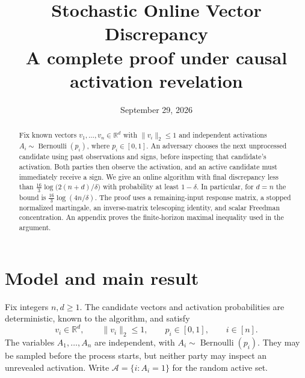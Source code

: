 \documentclass[11pt,a4paper]{article}
\title{\vspace{-1.2em}Stochastic Online Vector Discrepancy\\
  \large A complete proof under causal activation revelation}
\author{}
\date{September 29, 2026}
\numberwithin{equation}{section}
\theoremstyle{remark}
\newcommand{\R}{\mathbb R}
\begin{document}
\maketitle
\vspace{-1.8em}
\begin{abstract}
Fix known vectors $v_1,\ldots,v_n\in\R^d$ with $\|v_i\|_2\le1$ and
independent activations $A_i\sim\operatorname{Bernoulli}(p_i)$, where
$p_i\in[0,1]$. An adversary chooses the next unprocessed candidate using
past observations and signs, before inspecting that candidate's activation.
Both parties then observe the activation, and an active candidate must
immediately receive a sign. We give an online algorithm with final
discrepancy less than
$\frac{16}{3}\log\!\bigl(2(n+d)/\delta\bigr)$ with probability at least
$1-\delta$. In particular, for $d=n$ the bound is
$\frac{16}{3}\log(4n/\delta)$. The proof uses a remaining-input response
matrix, a stopped normalized martingale, an inverse-matrix telescoping
identity, and scalar Freedman concentration. An appendix proves the
finite-horizon maximal inequality used in the argument.
\end{abstract}

\section{Model and main result}
\label{sec:model}

Fix integers $n,d\ge1$. The candidate vectors and activation probabilities
are deterministic, known to the algorithm, and satisfy
\begin{equation}
 v_i\in\R^d,\qquad \|v_i\|_2\le1,\qquad p_i\in[0,1],
 \qquad i\in[n].
\end{equation}
The variables $A_1,\ldots,A_n$ are independent, with
$A_i\sim\operatorname{Bernoulli}(p_i)$. They may be sampled before the
process starts, but neither party may inspect an unrevealed activation.
Write $\mathcal A=\{i:A_i=1\}$ for the random active set.
\end{document}
